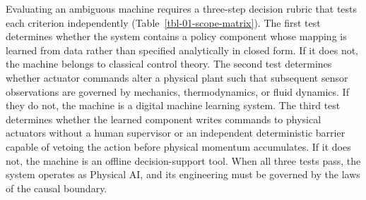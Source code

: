 \documentclass[
  10pt,
  letterpaper,
  twoside,
  openright,
  numbers=noenddot,
  headings=standardclasses
]{scrbook}
\begin{document}
Evaluating an ambiguous machine requires a three-step decision rubric
that tests each criterion independently
(Table~\ref{tbl-01-scope-matrix}). The first test determines whether the
system contains a policy component whose mapping is learned from data
rather than specified analytically in closed form. If it does not, the
machine belongs to classical control theory. The second test determines
whether actuator commands alter a physical plant such that subsequent
sensor observations are governed by mechanics, thermodynamics, or fluid
dynamics. If they do not, the machine is a digital machine learning
system. The third test determines whether the learned component writes
commands to physical actuators without a human supervisor or an
independent deterministic barrier capable of vetoing the action before
physical momentum accumulates. If it does not, the machine is an offline
decision-support tool. When all three tests pass, the system operates as
Physical AI, and its engineering must be governed by the laws of the
causal boundary.
\end{document}
